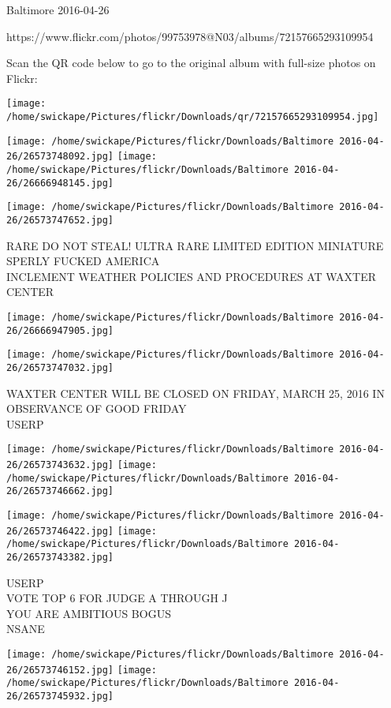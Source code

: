 \documentclass[10pt,letterpaper]{article}
\begin{document}
Baltimore 2016-04-26

https://www.flickr.com/photos/99753978@N03/albums/72157665293109954

Scan the QR code below to go to the original album with full-size photos on Flickr:

\texttt{[image: /home/swickape/Pictures/flickr/Downloads/qr/72157665293109954.jpg]}
\pagebreak

\texttt{[image: /home/swickape/Pictures/flickr/Downloads/Baltimore 2016-04-26/26573748092.jpg]}
\texttt{[image: /home/swickape/Pictures/flickr/Downloads/Baltimore 2016-04-26/26666948145.jpg]}

\texttt{[image: /home/swickape/Pictures/flickr/Downloads/Baltimore 2016-04-26/26573747652.jpg]}

RARE DO NOT STEAL!  ULTRA RARE LIMITED EDITION MINIATURE\\
SPERLY FUCKED AMERICA\\
INCLEMENT WEATHER POLICIES AND PROCEDURES AT WAXTER CENTER\\
\pagebreak

\texttt{[image: /home/swickape/Pictures/flickr/Downloads/Baltimore 2016-04-26/26666947905.jpg]}

\vspace{0.25in}
\texttt{[image: /home/swickape/Pictures/flickr/Downloads/Baltimore 2016-04-26/26573747032.jpg]}

WAXTER CENTER WILL BE CLOSED ON FRIDAY, MARCH 25, 2016 IN OBSERVANCE OF GOOD FRIDAY\\
USERP\\
\pagebreak

\texttt{[image: /home/swickape/Pictures/flickr/Downloads/Baltimore 2016-04-26/26573743632.jpg]}
\texttt{[image: /home/swickape/Pictures/flickr/Downloads/Baltimore 2016-04-26/26573746662.jpg]}

\texttt{[image: /home/swickape/Pictures/flickr/Downloads/Baltimore 2016-04-26/26573746422.jpg]}
\texttt{[image: /home/swickape/Pictures/flickr/Downloads/Baltimore 2016-04-26/26573743382.jpg]}

USERP\\
VOTE TOP 6 FOR JUDGE A THROUGH J\\
YOU ARE AMBITIOUS BOGUS\\
NSANE\\
\pagebreak

\texttt{[image: /home/swickape/Pictures/flickr/Downloads/Baltimore 2016-04-26/26573746152.jpg]}
\texttt{[image: /home/swickape/Pictures/flickr/Downloads/Baltimore 2016-04-26/26573745932.jpg]}
\end{document}
